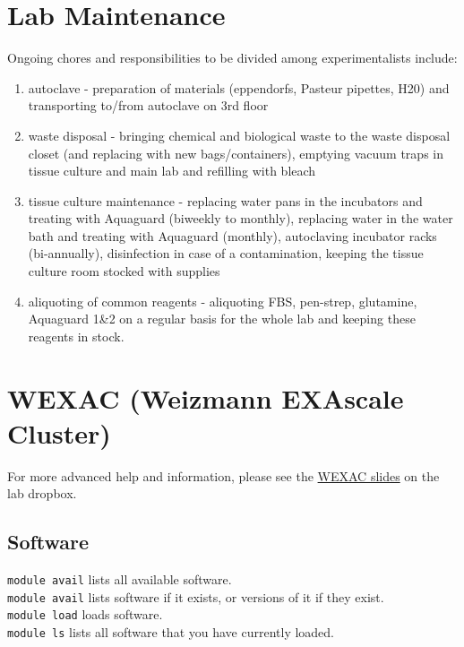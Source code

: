 \documentclass[]{book}
\providecommand{\tightlist}{%
  \setlength{\itemsep}{0pt}\setlength{\parskip}{0pt}}
\begin{document}
\chapter{Lab Maintenance}\label{labMaintenance}

Ongoing chores and responsibilities to be divided among experimentalists
include:

\begin{enumerate}
\def\labelenumi{\arabic{enumi}.}
\tightlist
\item
  autoclave - preparation of materials (eppendorfs, Pasteur pipettes,
  H20) and transporting to/from autoclave on 3rd floor
\item
  waste disposal - bringing chemical and biological waste to the waste
  disposal closet (and replacing with new bags/containers), emptying
  vacuum traps in tissue culture and main lab and refilling with bleach
\item
  tissue culture maintenance - replacing water pans in the incubators
  and treating with Aquaguard (biweekly to monthly), replacing water in
  the water bath and treating with Aquaguard (monthly), autoclaving
  incubator racks (bi-annually), disinfection in case of a
  contamination, keeping the tissue culture room stocked with supplies
\item
  aliquoting of common reagents - aliquoting FBS, pen-strep, glutamine,
  Aquaguard 1\&2 on a regular basis for the whole lab and keeping these
  reagents in stock.
\end{enumerate}

\chapter{WEXAC (Weizmann EXAscale Cluster)}\label{wexac}

For more advanced help and information, please see the
\href{https://www.dropbox.com/s/uuv6qrkrwlhytrm/wexac_introduction.pdf?dl=0}{WEXAC
slides} on the lab dropbox.

\section{Software}\label{software}

\texttt{module\ avail} lists all available software.\\
\texttt{module\ avail} lists software if it exists, or versions of it if
they exist.\\
\texttt{module\ load} loads software.\\
\texttt{module\ ls} lists all software that you have currently loaded.
\end{document}
